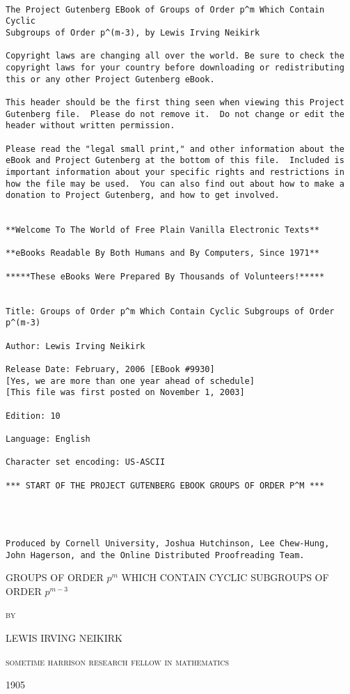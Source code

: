 \documentclass[oneside]{article}
\begin{document}
\thispagestyle{empty}
\small
\begin{verbatim}

The Project Gutenberg EBook of Groups of Order p^m Which Contain Cyclic
Subgroups of Order p^(m-3), by Lewis Irving Neikirk

Copyright laws are changing all over the world. Be sure to check the
copyright laws for your country before downloading or redistributing
this or any other Project Gutenberg eBook.

This header should be the first thing seen when viewing this Project
Gutenberg file.  Please do not remove it.  Do not change or edit the
header without written permission.

Please read the "legal small print," and other information about the
eBook and Project Gutenberg at the bottom of this file.  Included is
important information about your specific rights and restrictions in
how the file may be used.  You can also find out about how to make a
donation to Project Gutenberg, and how to get involved.


**Welcome To The World of Free Plain Vanilla Electronic Texts**

**eBooks Readable By Both Humans and By Computers, Since 1971**

*****These eBooks Were Prepared By Thousands of Volunteers!*****


Title: Groups of Order p^m Which Contain Cyclic Subgroups of Order p^(m-3)

Author: Lewis Irving Neikirk

Release Date: February, 2006 [EBook #9930]
[Yes, we are more than one year ahead of schedule]
[This file was first posted on November 1, 2003]

Edition: 10

Language: English

Character set encoding: US-ASCII

*** START OF THE PROJECT GUTENBERG EBOOK GROUPS OF ORDER P^M ***




Produced by Cornell University, Joshua Hutchinson, Lee Chew-Hung,
John Hagerson, and the Online Distributed Proofreading Team.

\end{verbatim}
\normalsize
\newpage



\begin{center}
\noindent \Large GROUPS OF ORDER $p^m$ WHICH CONTAIN CYCLIC
SUBGROUPS OF ORDER $p^{m-3}$

\bigskip
\normalsize\textsc{by}
\bigskip

\large LEWIS IRVING NEIKIRK

\footnotesize\textsc{sometime harrison research fellow in
mathematics}

\bigskip
\large 1905
\end{center}
\end{document}
